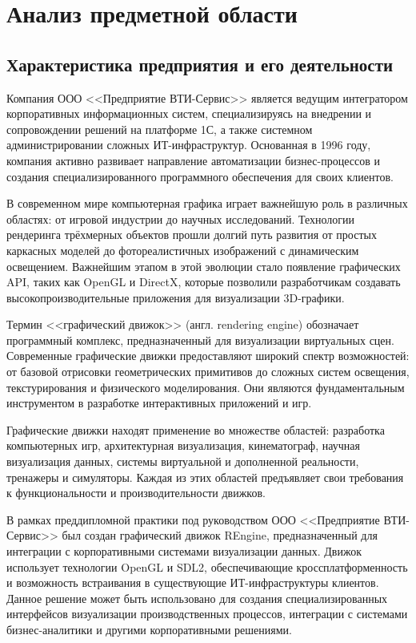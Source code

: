 \section{Анализ предметной области}
\subsection{Характеристика предприятия и его деятельности}

Компания ООО <<Предприятие ВТИ-Сервис>> является ведущим интегратором корпоративных информационных систем, специализируясь на внедрении и сопровождении решений на платформе 1С, а также системном администрировании сложных ИТ-инфраструктур. Основанная в 1996 году, компания активно развивает направление автоматизации бизнес-процессов и создания специализированного программного обеспечения для своих клиентов.

В современном мире компьютерная графика играет важнейшую роль в различных областях: от игровой индустрии до научных исследований. Технологии рендеринга трёхмерных объектов прошли долгий путь развития от простых каркасных моделей до фотореалистичных изображений с динамическим освещением. Важнейшим этапом в этой эволюции стало появление графических API, таких как OpenGL и DirectX, которые позволили разработчикам создавать высокопроизводительные приложения для визуализации 3D-графики.

Термин <<графический движок>> (англ. rendering engine) обозначает программный комплекс, предназначенный для визуализации виртуальных сцен. Современные графические движки предоставляют широкий спектр возможностей: от базовой отрисовки геометрических примитивов до сложных систем освещения, текстурирования и физического моделирования. Они являются фундаментальным инструментом в разработке интерактивных приложений и игр.

Графические движки находят применение во множестве областей: разработка компьютерных игр, архитектурная визуализация, кинематограф, научная визуализация данных, системы виртуальной и дополненной реальности, тренажеры и симуляторы. Каждая из этих областей предъявляет свои требования к функциональности и производительности движков.

В рамках преддипломной практики под руководством ООО <<Предприятие ВТИ-Сервис>> был создан графический движок REngine, предназначенный для интеграции с корпоративными системами визуализации данных. Движок использует технологии OpenGL и SDL2, обеспечивающие кроссплатформенность и возможность встраивания в существующие ИТ-инфраструктуры клиентов. Данное решение может быть использовано для создания специализированных интерфейсов визуализации производственных процессов, интеграции с системами бизнес-аналитики и другими корпоративными решениями.

